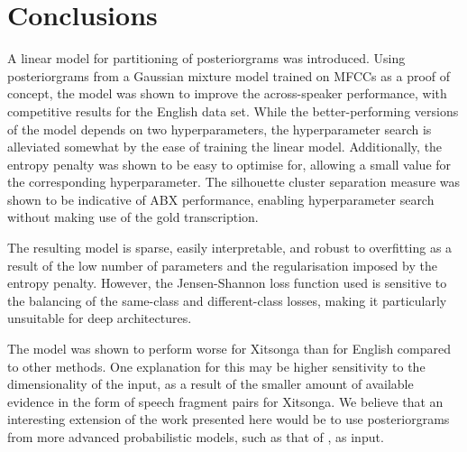 \section{Conclusions}
A linear model for partitioning of posteriorgrams was introduced.
Using posteriorgrams from a Gaussian mixture model trained on MFCCs as a proof of concept, the model was shown to improve the across-speaker performance, with competitive  results for the English data set.
While the better-performing versions of the model depends on two hyperparameters, the hyperparameter search is alleviated somewhat by the ease of training the linear model.
Additionally, the entropy penalty was shown to be easy to optimise for, allowing a small value for the corresponding hyperparameter.
The silhouette cluster separation measure was shown to be indicative of ABX performance, enabling hyperparameter search without making use of the gold transcription.

The resulting model is sparse, easily interpretable, and robust to overfitting as a result of the low number of parameters and the regularisation imposed by the entropy penalty.
However, the Jensen-Shannon loss function used is sensitive to the balancing of the same-class and different-class losses, making it particularly unsuitable for deep architectures.

The model was shown to perform worse for Xitsonga than for English compared to other methods.
One explanation for this may be higher sensitivity to the dimensionality of the input, as a result of the smaller amount of available evidence in the form of speech fragment pairs for Xitsonga.
We believe that an interesting extension of the work presented here would be to use posteriorgrams from more advanced probabilistic models, such as that of \textcite{chen2015parallel}, as input.

%
%



